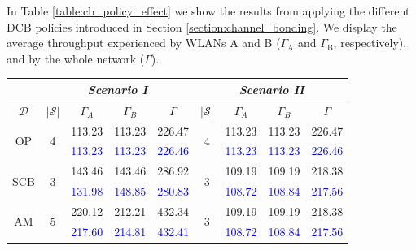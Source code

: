 \documentclass[a4paper]{article}
\begin{document}
	In Table \ref{table:cb_policy_effect} we show the results from applying the different DCB policies introduced in Section \ref{section:channel_bonding}. We display the average throughput experienced by WLANs A and B ($\Gamma_\text{A}$ and $\Gamma_\text{B}$, respectively), and by the whole network ($\Gamma$).
	\begin{table}[h]
		\centering
			\setlength\tabcolsep{1.5pt} %
			\begin{tabular}{c|c|c|c|c|c|c|c|c|}
				\cline{2-9}
				& \multicolumn{4}{c|}{\textit{Scenario I}}                                  & \multicolumn{4}{c|}{\textit{Scenario II}}                                \\ \hline
				\multicolumn{1}{|c|}{$\mathcal{D}$}                    & $|\mathcal{S}|$              & $\Gamma_A$ & $\Gamma_B$ & $\Gamma$ & $|\mathcal{S}|$             & $\Gamma_A$ & $\Gamma_B$ & $\Gamma$ \\ \hline
				
				\multicolumn{1}{|c|}{\multirow{2}{*}{OP}}  & \multirow{2}{*}{4}  & 113.23     & 113.23     & 226.47   & \multirow{2}{*}{4} & 113.23     & 113.23     & 226.47   \\  
				\multicolumn{1}{|c|}{}                     &                     & \textcolor{blue}{113.23}     & \textcolor{blue}{113.23}     & \textcolor{blue}{226.46}   &                    & \textcolor{blue}{113.23}     & \textcolor{blue}{113.23}     & \textcolor{blue}{226.46}   \\ \hline
				
				\multicolumn{1}{|c|}{\multirow{2}{*}{SCB}} & \multirow{2}{*}{3}  & 143.46     & 143.46     & 286.92   & \multirow{2}{*}{3} & 109.19     & 109.19     & 218.38   \\
				\multicolumn{1}{|c|}{}                     &                     & \textcolor{blue}{131.98}     & \textcolor{blue}{148.85}     & \textcolor{blue}{280.83}   &                    & \textcolor{blue}{108.72}     & \textcolor{blue}{108.84}     & \textcolor{blue}{217.56}   \\ \hline
	
				\multicolumn{1}{|c|}{\multirow{2}{*}{AM}}  & \multirow{2}{*}{5}  & 220.12     & 212.21     & 432.34   & \multirow{2}{*}{3} & 109.19     & 109.19     & 218.38   \\ 
				\multicolumn{1}{|c|}{}                     &                     & \textcolor{blue}{217.60}     & \textcolor{blue}{214.81}     & \textcolor{blue}{432.41}   &                    & \textcolor{blue}{108.72}     & \textcolor{blue}{108.84}     & \textcolor{blue}{217.56}   \\ \hline
				

\end{tabular}
\end{table}
\end{document}
